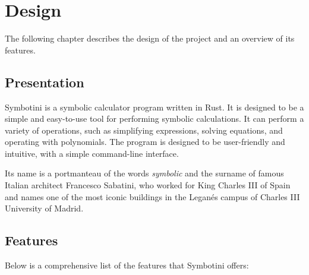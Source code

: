 \chapter{Design}\label{chap:design}

The following chapter describes the design of the project and an overview of its features.

\section{Presentation}\label{sec:presentation}

Symbotini is a symbolic calculator program written in Rust. It is designed to be a simple and easy-to-use tool for performing symbolic calculations. It can perform a variety of operations, such as simplifying expressions, solving equations, and operating with polynomials. The program is designed to be user-friendly and intuitive, with a simple command-line interface.

Its name is a portmanteau of the words \textit{symbolic} and the surname of famous Italian architect Francesco Sabatini, who worked for King Charles III of Spain and names one of the most iconic buildings in the Leganés campus of Charles III University of Madrid.

\section{Features}\label{sec:features}

Below is a comprehensive list of the features that Symbotini offers:

